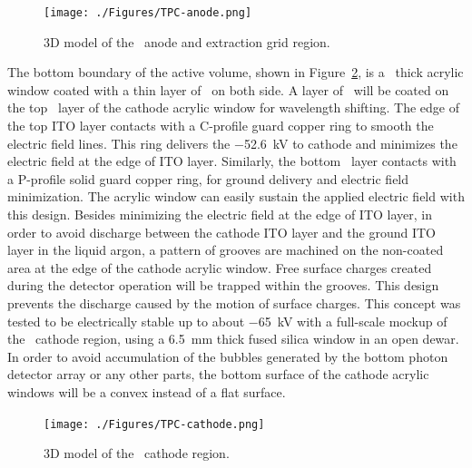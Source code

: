 \begin{figure}[h!]
\centering
\texttt{[image: ./Figures/TPC-anode.png]}
\caption{3D model of the \LArTPC\ anode and extraction grid region.}
\label{fig:TPC_anode}
\end{figure}

The bottom boundary of the active volume, shown in Figure~\ref{fig:TPC_cathode}, is a \DSkPMMATPCThickness\ thick acrylic window coated with a thin layer of \ITO\ on both side. A layer of \TPB\ will be coated on the top \ITO\ layer of the cathode acrylic window for wavelength shifting. The edge of the top ITO layer contacts with a C-profile guard copper ring to smooth the electric field lines. This ring delivers the \SI{-52.6}{\kV} to cathode and minimizes the electric field at the edge of ITO layer. Similarly, the bottom \ITO\ layer contacts with a P-profile solid guard copper ring, for ground delivery and electric field minimization. The acrylic window can easily sustain the applied electric field with this design. Besides minimizing the electric field at the edge of ITO layer, in order to avoid discharge between the cathode ITO layer and the ground ITO layer in the liquid argon, a pattern of grooves are machined on the non-coated area at the edge of the cathode acrylic window. 
Free surface charges created during the detector operation will be trapped within the grooves. This design prevents the discharge caused by the motion of surface charges.
This concept was tested to be electrically stable up to about \SI{-65}{\kV} with a full-scale mockup of the \DSf\ cathode region, using a \SI{6.5}{\mm} thick fused silica window in an open dewar. 
In order to avoid accumulation of the bubbles generated by the bottom photon detector array or any other parts, the bottom surface of the cathode acrylic windows will be a convex instead of a flat surface.

\begin{figure}[h!]
\centering
\texttt{[image: ./Figures/TPC-cathode.png]}
\caption{3D model of the \LArTPC\ cathode region.}
\label{fig:TPC_cathode}
\end{figure}

